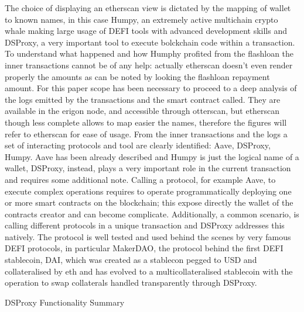 \documentclass[11pt,a4paper,titlepage]{scrartcl}
\begin{document}
The choice of displaying an etherscan view is  dictated by the mapping of wallet to known names, in this case Humpy, an extremely active multichain crypto whale making large usage of DEFI tools with advanced  development skills and DSProxy, a very important tool to execute bolckchain  code within a transaction.
To understand what happened and how Humphy profited from the flashloan the inner transactions cannot be of any help: actually etherscan doesn't even render properly the amounts as can be noted by looking the flashloan repayment amount. For this paper scope has been necessary to proceed to a deep analysis of the logs emitted by the transactions and the smart contract called. They are available in the erigon node, and accessible through otterscan, but etherscan though less complete allows to map easier the names, therefore the figures will refer to etherscan for ease of usage.
From the inner transactions and the logs a set of interacting protocols and tool are clearly identified: Aave, DSProxy, Humpy. Aave has been already described and Humpy is just the logical name of a wallet, DSProxy, instead, plays a very important role in the current transaction and requires some additional note. Calling a protocol, for example Aave, to execute complex operations requires to operate programmatically deploying one or more smart contracts on the blockchain; this expose directly the wallet of the contracts creator and can become complicate. Additionally, a common scenario, is calling different protocols in a unique transaction and DSProxy addresses  this natively. The protocol is well tested and used behind the scenes by very famous DEFI  protocols, in particular MakerDAO, the protocol behind the first DEFI stablecoin, DAI, which was created as a stablecon  pegged to USD and collateralised by eth and has evolved to a multicollateralised stablecoin with the operation to swap  collaterals handled transparently through DSProxy.

\begin{table}[H]
\centering
\caption{DSProxy Functionality Summary}
\captionsetup{font=footnotesize, justification=centering}
\caption*{\footnotesize This table summarizes the key functionalities of the DSProxy contract, used for interacting with DeFi protocols securely and efficiently.}
\label{tab:dsproxy_functionality}
\end{table}
\end{document}
